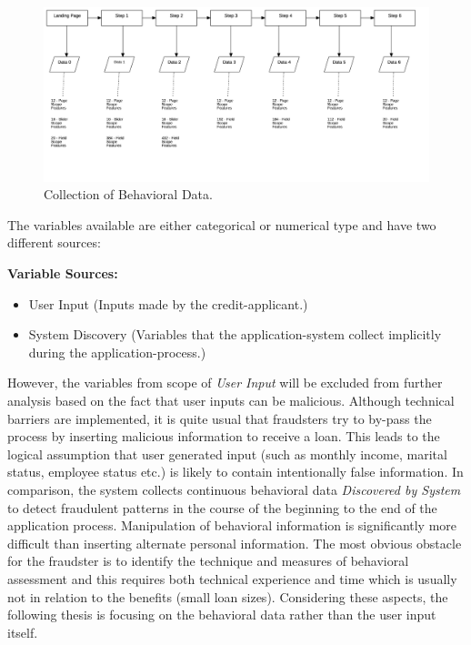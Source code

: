 \begin{figure}[h]
    \centering
    \includegraphics[scale=0.20]{Graphics/FlowchartDiagram1.png}
    \caption{Collection of Behavioral Data.}
    \label{fig:behav-data}
\end{figure}

The variables available are either categorical or numerical type and have two different sources:

\textbf{Variable Sources:}
\begin{itemize}
    \item User Input (Inputs made by the credit-applicant.)
    \item System Discovery (Variables that the application-system collect implicitly during the application-process.)
\end{itemize}

However, the variables from scope of \textit{User Input} will be excluded from further analysis based on the fact that user inputs can be malicious. Although technical barriers are implemented, it is quite usual that fraudsters try to by-pass the process by inserting malicious information to receive a loan. This leads to the logical assumption that user generated input (such as monthly income, marital status, employee status etc.) is likely to contain intentionally false information. In comparison, the system collects continuous behavioral data \textit{Discovered by System} to detect fraudulent patterns in the course of the beginning to the end of the application process. Manipulation of behavioral information is significantly more difficult than inserting alternate personal information. The most obvious obstacle for the fraudster is to identify the technique and measures of behavioral assessment and this requires both technical experience and time which is usually not in relation to the benefits (small loan sizes). Considering these aspects, the following thesis is focusing on the behavioral data rather than the user input itself. 

